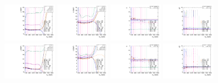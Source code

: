 \begin{figure}[htbp]
  \includegraphics[width=0.2\textwidth]{fig/analysis/paramSignalShape_allSig_MJJ_HP_nobb_DEtaHi_mean.pdf}
  \includegraphics[width=0.2\textwidth]{fig/analysis/paramSignalShape_allSig_MJJ_HP_nobb_DEtaHi_sigma.pdf}
  \includegraphics[width=0.2\textwidth]{fig/analysis/paramSignalShape_allSig_MJJ_HP_nobb_DEtaHi_alpha.pdf}
  \includegraphics[width=0.2\textwidth]{fig/analysis/paramSignalShape_allSig_MJJ_HP_nobb_DEtaHi_alpha2.pdf}\\
  \includegraphics[width=0.2\textwidth]{fig/analysis/paramSignalShape_allSig_MJJ_LP_nobb_DEtaHi_mean.pdf}
  \includegraphics[width=0.2\textwidth]{fig/analysis/paramSignalShape_allSig_MJJ_LP_nobb_DEtaHi_sigma.pdf}
  \includegraphics[width=0.2\textwidth]{fig/analysis/paramSignalShape_allSig_MJJ_LP_nobb_DEtaHi_alpha.pdf}
  \includegraphics[width=0.2\textwidth]{fig/analysis/paramSignalShape_allSig_MJJ_LP_nobb_DEtaHi_alpha2.pdf}\\

\end{figure}
